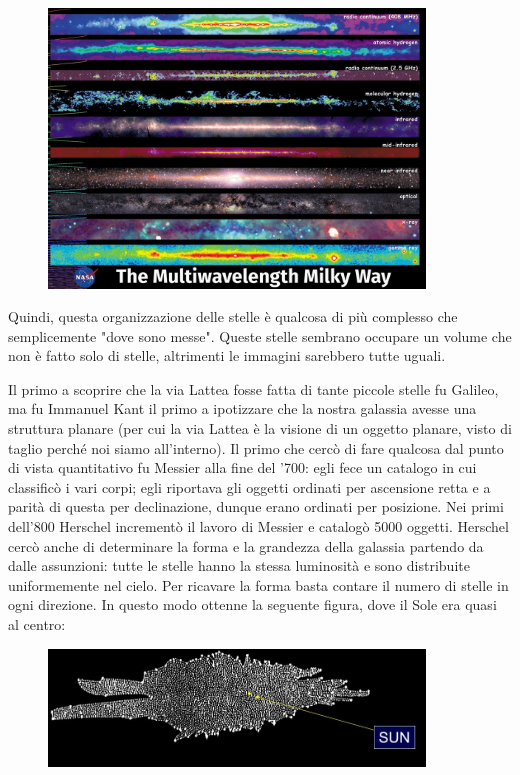\begin{figure}[H]
    \centering
    \includegraphics[width=10cm]{Via Lattea.JPG}
\end{figure}

Quindi, questa organizzazione delle stelle è qualcosa di più complesso che semplicemente "dove sono messe". Queste stelle sembrano occupare un volume che non è fatto solo di stelle, altrimenti le immagini sarebbero tutte uguali.

Il primo a scoprire che la via Lattea fosse fatta di tante piccole stelle fu Galileo, ma fu Immanuel Kant il primo a ipotizzare che la nostra galassia avesse una struttura planare (per cui la via Lattea è la visione di un oggetto planare, visto di taglio perché noi siamo all'interno). 
Il primo che cercò di fare qualcosa dal punto di vista quantitativo fu Messier alla fine del '700: egli fece un catalogo in cui classificò i vari corpi; egli riportava gli oggetti ordinati per ascensione retta e a parità di questa per declinazione, dunque erano ordinati per posizione. Nei primi dell'800 Herschel incrementò il lavoro di Messier e catalogò 5000 oggetti. Herschel cercò anche di determinare la forma e la grandezza della galassia partendo da dalle assunzioni: tutte le stelle hanno la stessa luminosità e sono distribuite uniformemente nel cielo. Per ricavare la forma basta contare il numero di stelle in ogni direzione. In questo modo ottenne la seguente figura, dove il Sole era quasi al centro:

\begin{figure}[H]
    \centering
    \includegraphics[width=10cm]{Via Lattea di Herschel.JPG}
\end{figure}

